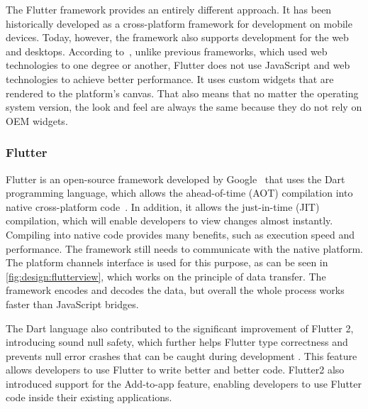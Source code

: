 The Flutter framework provides an entirely different approach.
It has been historically developed as a cross-platform framework for development on mobile devices.
Today, however, the framework also supports development for the web and desktops.
According to~\cite{leler_2017_whats}, unlike previous frameworks, which used web technologies to one degree or another, Flutter does not use JavaScript and web technologies to achieve better performance.
It uses custom widgets that are rendered to the platform's canvas.
That also means that no matter the operating system version, the look and feel are always the same because they do not rely on OEM widgets. 

\subsubsection{Flutter}

Flutter is an open-source framework developed by Google~\cite{a2022_flutter} that uses the Dart programming language, which allows the ahead-of-time (AOT) compilation into native cross-platform code~\cite{leler_2017_whats}.
In addition, it allows the just-in-time (JIT) compilation, which will enable developers to view changes almost instantly.
Compiling into native code provides many benefits, such as execution speed and performance.
The framework still needs to communicate with the native platform.
The platform channels interface is used for this purpose, as can be seen in \ref{fig:design:flutterview}, which works on the principle of data transfer.
The framework encodes and decodes the data, but overall the whole process works faster than JavaScript bridges.

The Dart language also contributed to the significant improvement of Flutter 2, introducing sound null safety, which further helps Flutter type correctness and prevents null error crashes that can be caught during development \cite{sells_2021_whats}.
This feature allows developers to use Flutter to write better and better code.
Flutter2 also introduced support for the Add-to-app feature, enabling developers to use Flutter code inside their existing applications.

